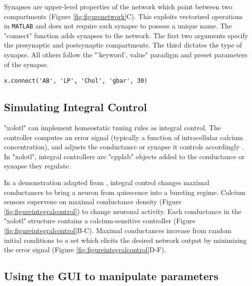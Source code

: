 \documentclass{frontiersSCNS} %
\begin{document}
Synapses are upper-level properties of the network which point between two compartments (Figure \ref{fig:figurenetwork}C). This exploits vectorized operations in \texttt{MATLAB} and does not require each synapse to possess a unique name. The "connect" function adds synapses to the network. The first two arguments specify the presynaptic and postsynaptic compartments. The third dictates the type of synapse. All others follow the "'keyword', value" paradigm and preset parameters of the synapse.

\begin{lstlisting}[style=Matlab-editor]
	x.connect('AB', 'LP', 'Chol', 'gbar', 30)
\end{lstlisting}

%
%
%
%
%
%

\subsection{Simulating Integral Control}

"xolotl" can implement homeostatic tuning rules as integral control. The controller computes an error signal (typically a function of intracellular calcium concentration), and adjusts the conductance or synapse it controls accordingly \autocite{olearyCorrelationsIonChannel2013}. In "xolotl", integral controllers are "cpplab" objects added to the conductance or synapse they regulate.

In a demonstration adapted from \cite{olearyCorrelationsIonChannel2013}, integral control changes maximal conductances to bring a neuron from quiescence into a bursting regime. Calcium sensors supervene on maximal conductance density (Figure \ref{fig:figureintegralcontrol}) to change neuronal activity. Each conductance in the "xolotl" structure contains a calcium-sensitive controller (Figure \ref{fig:figureintegralcontrol}B-C). Maximal conductances increase from random initial conditions to a set which elicits the desired network output by minimizing the error signal (Figure \ref{fig:figureintegralcontrol}D-F).

%
%
%
%
%
%

\subsection{Using the GUI to manipulate parameters}
\end{document}
